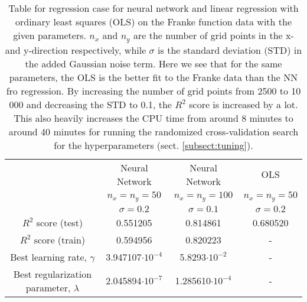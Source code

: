 \documentclass[12pt,a4paper,english]{article}
\begin{document}
\begin{table}[htbp!]
	\centering
	\begin{tabular}{ |c|c|c|c| }
		\hline \rule{0pt}{13pt}
		& Neural Network  & Neural Network  & OLS  \\
		& $n_x=n_y=50$ & $n_x=n_y=100$ & $n_x=n_y=50$ \\
		& $\sigma=0.2$ & $\sigma=0.1$ & $\sigma=0.2$ \\
		\hline \rule{0pt}{13pt}
		$R^2$ score (test) & 0.551205 & 0.814861 & 0.680520 \\
		\hline \rule{0pt}{13pt}
		$R^2$ score (train) & 0.594956 & 0.820223 & - \\
		\hline \rule{0pt}{13pt}
		Best learning rate, $\gamma$ & 3.947107$\cdot10^{-4}$ & 5.8293$\cdot10^{-2}$ & - \\
		\hline \rule{0pt}{13pt}
		Best regularization parameter, $\lambda$ & 2.045894$\cdot10^{-7}$ & 1.285610$\cdot10^{-4}$ & - \\
		\hline
	\end{tabular}	
	\caption{Table for regression case for neural network and linear regression with ordinary least squares (OLS) on the Franke function data with the given parameters. $n_x$ and $n_y$ are the number of grid points in the x- and y-direction respectively, while $\sigma$ is the standard deviation (STD) in the added Gaussian noise term. Here we see that for the same parameters, the OLS is the better fit to the Franke data than the NN fro regression. By increasing the number of grid points from 2500 to 10 000 and decreasing the STD to 0.1, the $R^2$ score is increased by a lot. This also heavily increases the CPU time from around 8 minutes to around 40 minutes for running the randomized cross-validation search for the hyperparameters (sect. \ref{subsect:tuning}).}
	\label{tab:reg}
\end{table}
\end{document}
